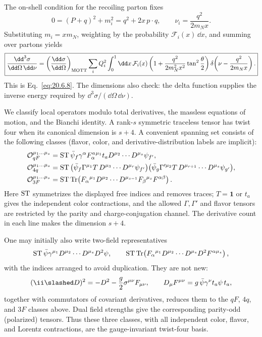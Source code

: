 \begin{enumerate}
  The on-shell condition for the recoiling parton fixes
  \[
    0=(P+q)^2+m_i^2
      =q^2+2x\,p\cdot q,
    \qquad
    \nu_i=\frac{q^2}{2m_Nx}.
  \]
  Substituting \(m_i=xm_N\), weighting by the probability
  \(\mathcal F_i(x)\,\dd x\), and summing over partons yields
  \[
  \boxed{
    \frac{\dd^3\sigma}{\dd\Omega\,\dd\nu}
      =\left(\frac{\dd\sigma}{\dd\Omega}\right)_{\rm MOTT}
       \sum_iQ_i^2\int_0^1\dd x\,\mathcal F_i(x)
       \left(1+\frac{q^2}{2m_N^2x^2}
         \tan^2\frac{\theta}{2}\right)
       \delta\!\left(\nu-\frac{q^2}{2m_Nx}\right).}
  \]
  This is Eq.~\eqref{eq:20.6.8}.  The dimensions also check: the delta
  function supplies the inverse energy required by
  \(\dd^3\sigma/(\dd\Omega\,\dd\nu)\).

  We classify local operators modulo total derivatives, the massless
  equations of motion, and the Bianchi identity.  A rank-\(s\) symmetric
  traceless tensor has twist four when its canonical dimension is
  \(s+4\).  A convenient spanning set consists of the following classes
  (flavor, color, and derivative-distribution labels are implicit):
  \[
  \begin{aligned}
    \mathcal O_{qF}^{\mu_1\ldots\mu_s}
      &={\rm ST}\,
        \bar\psi_f\gamma^\alpha
        F^a_{\alpha}{}^{\mu_1}t_a
        D^{\mu_2}\cdots D^{\mu_s}\psi_{f'},\\
    \mathcal O_{4q}^{\mu_1\ldots\mu_s}
      &={\rm ST}\,
        \bigl(\bar\psi_f\Gamma^{\mu_1}T\,
          D^{\mu_3}\cdots D^{\mu_r}\psi_{f'}\bigr)
        \bigl(\bar\psi_g\Gamma'^{\mu_2}T\,
          D^{\mu_{r+1}}\cdots D^{\mu_s}\psi_{g'}\bigr),\\
    \mathcal O_{3F}^{\mu_1\ldots\mu_s}
      &={\rm ST}\,
        {\rm Tr}\!\left(
        F_{\alpha}{}^{\mu_1}
        D^{\mu_2}\cdots D^{\mu_{s-1}}
        F_{\beta}{}^{\mu_s}F^{\alpha\beta}\right).
  \end{aligned}
  \]
  Here \({\rm ST}\) symmetrizes the displayed free indices and removes
  traces; \(T=\mathbf{1}\) or \(t_a\) gives the independent color
  contractions, and the allowed \(\Gamma,\Gamma'\) and flavor tensors
  are restricted by the parity and charge-conjugation channel.  The
  derivative count in each line makes the dimension \(s+4\).

  One may initially also write two-field representatives
  \[
    {\rm ST}\,\bar\psi\gamma^{\mu_1}
      D^{\mu_2}\cdots D^{\mu_s}D^2\psi,\qquad
    {\rm ST}\,{\rm Tr}\!\left(
      F_{\alpha}{}^{\mu_1}
      D^{\mu_2}\cdots D^{\mu_s}D^2F^{\alpha\mu_s}\right),
  \]
  with the indices arranged to avoid duplication.  They are not new:
  \[
    (\ii\slashed D)^2=-D^2-\frac g2\sigma^{\mu\nu}F_{\mu\nu},
    \qquad D_\mu F^{\mu\nu}=g\,\bar\psi\gamma^\nu t_a\psi\,t_a,
  \]
  together with commutators of covariant derivatives, reduces them to
  the \(qF\), \(4q\), and \(3F\) classes above.  Dual field strengths give
  the corresponding parity-odd (polarized) tensors.  Thus these three
  classes, with all independent color, flavor, and Lorentz contractions,
  are the gauge-invariant twist-four basis.


\end{enumerate}
